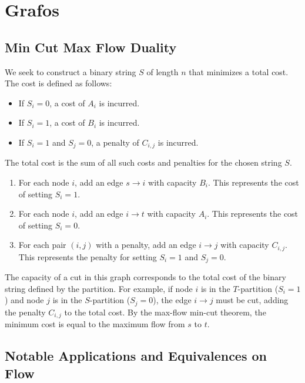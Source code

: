 \section{Grafos}

\subsection{Min Cut Max Flow Duality}
We seek to construct a binary string $S$ of length $n$ that minimizes a total cost. The cost is defined as follows:
\begin{itemize}
    \item If $S_i=0$, a cost of $A_i$ is incurred.
    \item If $S_i=1$, a cost of $B_i$ is incurred.
    \item If $S_i=1$ and $S_j=0$, a penalty of $C_{i,j}$ is incurred.
\end{itemize}
The total cost is the sum of all such costs and penalties for the chosen string $S$.
\begin{enumerate}
    \item For each node $i$, add an edge $s \to i$ with capacity $B_i$. This represents the cost of setting $S_i=1$.
    \item For each node $i$, add an edge $i \to t$ with capacity $A_i$. This represents the cost of setting $S_i=0$.
    \item For each pair $(i, j)$ with a penalty, add an edge $i \to j$ with capacity $C_{i,j}$. This represents the penalty for setting $S_i=1$ and $S_j=0$.
\end{enumerate}

The capacity of a cut in this graph corresponds to the total cost of the binary string defined by the partition. For example, if node $i$ is in the $T$-partition ($S_i=1$) and node $j$ is in the $S$-partition ($S_j=0$), the edge $i \to j$ must be cut, adding the penalty $C_{i,j}$ to the total cost. By the max-flow min-cut theorem, the minimum cost is equal to the maximum flow from $s$ to $t$.


\subsection{Notable Applications and Equivalences on Flow}

